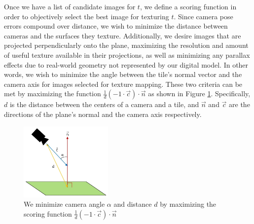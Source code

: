 \documentclass[]{spie}  %
\begin{document}
Once we have a list of candidate images for $t$, we define a scoring
function in order to objectively select the best image for texturing
$t$. Since camera pose errors compound over distance, we wish to
minimize the distance between cameras and the surfaces they
texture. Additionally, we desire images that are projected
perpendicularly onto the plane, maximizing the resolution and amount
of useful texture available in their projections, as well as
minimizing any parallax effects due to real-world geometry not
represented by our digital model. In other words, we wish to minimize
the angle between the tile's normal vector and the camera axis for
images selected for texture mapping. These two criteria can be met by
maximizing the function $\frac{1}{d} (-1 \cdot \vec{c}) \cdot \vec{n}$
as shown in Figure \ref{fig:scoringFunction}. Specifically, $d$ is the
distance between the centers of a camera and a tile, and $\vec{n}$ and
$\vec{c}$ are the directions of the plane's normal and the camera axis
respectively.

\begin{figure}
  \centering
  \includegraphics[height=1.5in]{scoringFunction.jpg}
  \caption{We minimize camera angle $\alpha$ and distance $d$ by
    maximizing the scoring function $\frac{1}{d} (-1 \cdot \vec{c})
    \cdot \vec{n}$}
  \label{fig:scoringFunction}
\end{figure}
\end{document}
